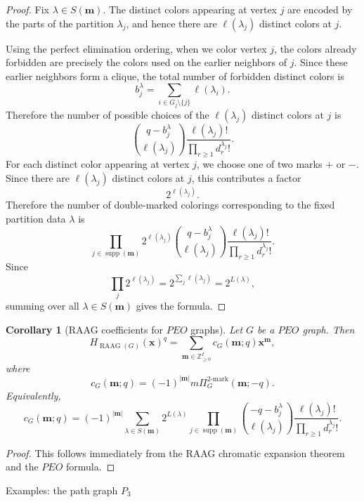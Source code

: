 \documentclass[11pt,reqno]{amsart}
\makeatletter
\numberwithin{equation}{section} %
\newtheorem{cor}{Corollary}
\theoremstyle{definition}
\theoremstyle{remark}
\newcommand{\supp}{\operatorname{supp}}
\newcommand{\RAAG}{\operatorname{RAAG}}
\numberwithin{equation}{section}
\def\section{\def\@secnumfont{\mdseries}\@startsection{section}{1}%
  \z@{.7\linespacing\@plus\linespacing}{.5\linespacing}%
  {\normalfont\scshape\centering}}
\makeatother
\begin{document}
\begin{proof}
Fix \(\lambda\in S(\mathbf m)\). The distinct colors appearing at vertex \(j\) are encoded by the
parts of the partition \(\lambda_j\), and hence there are \(\ell(\lambda_j)\) distinct colors at
\(j\).

Using the perfect elimination ordering, when we color vertex \(j\), the colors already forbidden
are precisely the colors used on the earlier neighbors of \(j\). Since these earlier neighbors form
a clique, the total number of forbidden distinct colors is
\[
b_j^\lambda
=
\sum_{i\in G_j\setminus\{j\}}\ell(\lambda_i).
\]
Therefore the number of possible choices of the \(\ell(\lambda_j)\) distinct colors at \(j\) is
\[
\binom{q-b_j^\lambda}{\ell(\lambda_j)}
\frac{\ell(\lambda_j)!}
{\prod_{r\ge1}d_r^{\lambda_j}!}.
\]
For each distinct color appearing at vertex \(j\), we choose one of two marks \(+\) or \(-\).
Since there are \(\ell(\lambda_j)\) distinct colors at \(j\), this contributes a factor
\[
2^{\ell(\lambda_j)}.
\]
Therefore the number of double-marked colorings corresponding to the fixed partition data
\(\lambda\) is
\[
\prod_{j\in\supp(\mathbf m)}
2^{\ell(\lambda_j)}
\binom{q-b_j^\lambda}{\ell(\lambda_j)}
\frac{\ell(\lambda_j)!}
{\prod_{r\ge1}d_r^{\lambda_j}!}.
\]
Since
\[
\prod_j 2^{\ell(\lambda_j)}
=
2^{\sum_j\ell(\lambda_j)}
=
2^{L(\lambda)},
\]
summing over all \(\lambda\in S(\mathbf m)\) gives the formula.
\end{proof}

\begin{cor}[RAAG coefficients for $PEO$  graphs]
Let \(G\) be a $PEO$  graph. Then
\[
H_{\RAAG(G)}(\mathbf x)^q
=
\sum_{\mathbf m\in\mathbb{Z}_{\ge0}^{I}}
c_G(\mathbf m;q)\mathbf x^{\mathbf m},
\]
where
\[
c_G(\mathbf m;q)
=
(-1)^{|\mathbf m|}
m\Pi_G^{2\text{-mark}}(\mathbf m;-q).
\]
Equivalently,
\[
c_G(\mathbf m;q)
=
(-1)^{|\mathbf m|}
\sum_{\lambda\in S(\mathbf m)}
2^{L(\lambda)}
\prod_{j\in\supp(\mathbf m)}
\binom{-q-b_j^\lambda}{\ell(\lambda_j)}
\frac{\ell(\lambda_j)!}
{\prod_{r\ge1}d_r^{\lambda_j}!}.
\]
\end{cor}

\begin{proof}
This follows immediately from the RAAG chromatic expansion theorem and the $PEO$  formula.
\end{proof}

\section{Examples: the path graph \(P_3\)}
\end{document}
